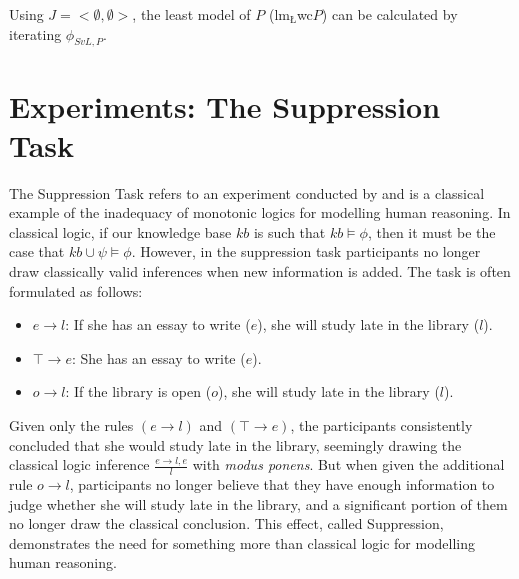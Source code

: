 \documentclass{article}
\begin{document}
Using $J=<\emptyset, \emptyset>$, the least model of $P$ ($\textrm{lm}_\textrm{\L}$wc$P$) can be calculated by iterating $\phi_{SvL,P}$.

\section{Experiments: The Suppression Task} \label{sec:sup}
The Suppression Task refers to an experiment conducted by \cite{byrne1989suppressing} and is a classical example of the inadequacy of monotonic logics for modelling human reasoning. In classical logic, if our knowledge base $kb$ is such that $kb \models \phi$, then it must be the case that $kb \cup \psi \models \phi$. However, in the suppression task participants no longer draw classically valid inferences when new information is added. The task is often formulated as follows:

\begin{itemize}
\item $e \rightarrow l$: If she has an essay to write ($e$), she will study late in the library ($l$).
\item $\top \rightarrow e$: She has an essay to write ($e$).
\item $o\rightarrow l$: If the library is open ($o$), she will study late in the library ($l$).
\end{itemize}

Given only the rules $(e \rightarrow l)$ and $(\top \rightarrow e)$, the participants consistently concluded that she would study late in the library, seemingly drawing the classical logic inference $\frac{e \rightarrow l, e}{l}$ with \textit{modus ponens}. But when given the additional rule $o\rightarrow l$, participants no longer believe that they have enough information to judge whether she will study late in the library, and a significant portion of them no longer draw the classical conclusion. This effect, called Suppression, demonstrates the need for something more than classical logic for modelling human reasoning.
\end{document}
